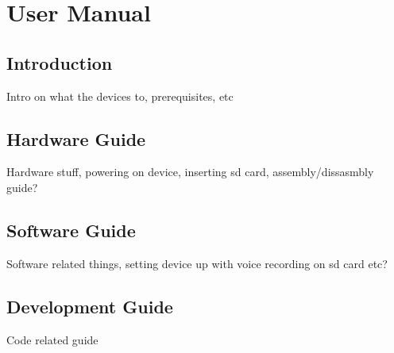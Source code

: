 \chapter{User Manual}
\label{ch:usermanual}

	\section{Introduction}
	\label{sec:usermanual_intro}

		Intro on what the devices to, prerequisites, etc


	
	\section{Hardware Guide}
	\label{sec:usermanual_hardware}

		Hardware stuff, powering on device, inserting sd card, assembly/dissasmbly guide? 

	\section{Software Guide}
	\label{sec:usermanual_software}

		Software related things, setting device up with voice recording on sd card etc?


	\section{Development Guide}
	\label{sec:usermanual_development}

		Code related guide
